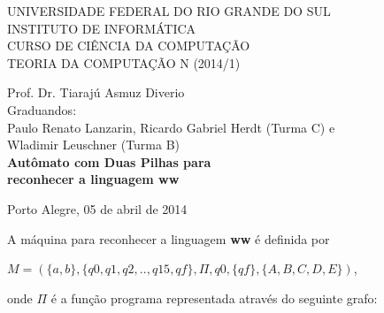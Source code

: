 \documentclass[a4paper]{article}
\begin{document}
\begin{titlepage}
\begin{center}


\large{ 
\uppercase{ Universidade Federal do Rio Grande do Sul\\

Instituto de Informática \\

Curso de Ciência da Computação \\

Teoria da Computação N (2014/1)\\
}

Prof. Dr. Tiarajú Asmuz Diverio \\


Graduandos: \\ Paulo Renato Lanzarin, Ricardo Gabriel Herdt (Turma C) e \\
	Wladimir Leuschner (Turma B) \\[4.5cm]



\LARGE {\bfseries Autômato com Duas Pilhas para \\
	reconhecer a linguagem ww \\[1.0cm]
}}


\vfill

Porto Alegre, 05 de abril de 2014

\end{center}
\end{titlepage}

A máquina para reconhecer a linguagem \textbf{ww} é definida por

$M = (\{a, b\}, \{q0, q1, q2, .., q15, qf\}, \Pi, q0, \{qf\}, \{A, B, C, D, E\})$, 

onde $\Pi$ é a função programa representada através do seguinte grafo:
\end{document}
